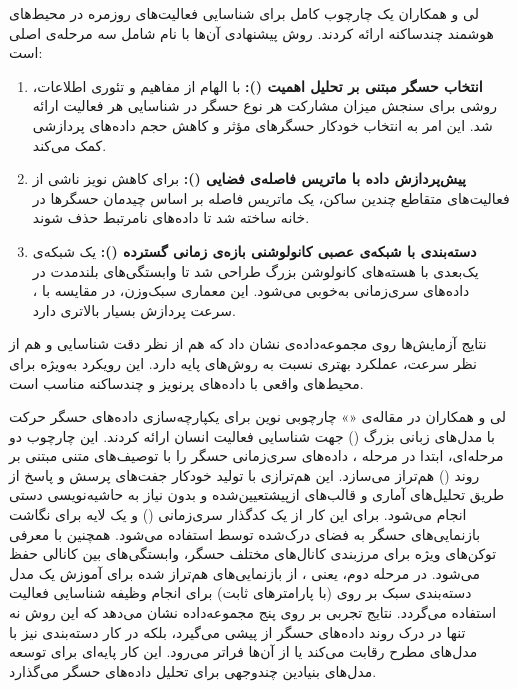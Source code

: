 لی و همکاران\cite{li2023human} یک چارچوب کامل برای شناسایی فعالیت‌های روزمره در محیط‌های هوشمند چندساکنه ارائه کردند. روش پیشنهادی آن‌ها با نام  شامل سه مرحله‌ی اصلی است:
\begin{enumerate}
\item \textbf{انتخاب حسگر مبتنی بر تحلیل اهمیت ():} با الهام از مفاهیم  و تئوری اطلاعات، روشی برای سنجش میزان مشارکت هر نوع حسگر در شناسایی هر فعالیت ارائه شد. این امر به انتخاب خودکار حسگرهای مؤثر و کاهش حجم داده‌های پردازشی کمک می‌کند.
\item \textbf{پیش‌پردازش داده با ماتریس فاصله‌ی فضایی ():} برای کاهش نویز ناشی از فعالیت‌های متقاطع چندین ساکن، یک ماتریس فاصله بر اساس چیدمان حسگرها در خانه ساخته شد تا داده‌های نامرتبط حذف شوند.
\item \textbf{دسته‌بندی با شبکه‌ی عصبی کانولوشنی بازه‌ی زمانی گسترده ():} یک شبکه‌ی  یک‌بعدی با هسته‌های کانولوشن بزرگ طراحی شد تا وابستگی‌های بلندمدت در داده‌های سری‌زمانی به‌خوبی می‌شود. این معماری سبک‌وزن، در مقایسه با ، سرعت پردازش بسیار بالاتری دارد.
\end{enumerate}

نتایج آزمایش‌ها روی مجموعه‌داده‌ی  نشان داد که  هم از نظر دقت شناسایی و هم از نظر سرعت، عملکرد بهتری نسبت به روش‌های پایه دارد. این رویکرد به‌ویژه برای محیط‌های واقعی با داده‌های پرنویز و چندساکنه مناسب است.

لی و همکاران \cite{li2024sensorllm} در مقاله‌ی «» چارچوبی نوین برای یکپارچه‌سازی داده‌های حسگر حرکت با مدل‌های زبانی بزرگ () جهت شناسایی فعالیت انسان ارائه کردند. این چارچوب دو مرحله‌ای، ابتدا در مرحله ، داده‌های سری‌زمانی حسگر را با توصیف‌های متنی مبتنی بر روند () هم‌تراز می‌سازد. این هم‌ترازی با تولید خودکار جفت‌های پرسش و پاسخ از طریق تحلیل‌های آماری و قالب‌های ازپیشتعیین‌شده و بدون نیاز به حاشیه‌نویسی دستی انجام می‌شود. برای این کار از یک کدگذار سری‌زمانی () و یک لایه  برای نگاشت بازنمایی‌های حسگر به فضای درک‌شده توسط  استفاده می‌شود. همچنین با معرفی توکن‌های ویژه برای مرزبندی کانال‌های مختلف حسگر، وابستگی‌های بین کانالی حفظ می‌شود. در مرحله دوم، یعنی ، از بازنمایی‌های هم‌تراز شده برای آموزش یک مدل دسته‌بندی سبک بر روی  (با پارامترهای ثابت) برای انجام وظیفه شناسایی فعالیت استفاده می‌گردد. نتایج تجربی بر روی پنج مجموعه‌داده نشان می‌دهد که این روش نه تنها در درک روند داده‌های حسگر از  پیشی می‌گیرد، بلکه در کار دسته‌بندی نیز با مدل‌های مطرح رقابت می‌کند یا از آن‌ها فراتر می‌رود. این کار پایه‌ای برای توسعه مدل‌های بنیادین چندوجهی برای تحلیل داده‌های حسگر می‌گذارد.

